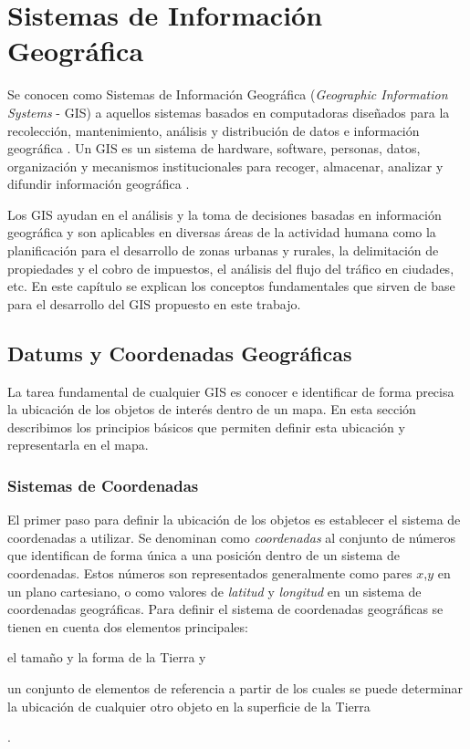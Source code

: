 \chapter{Sistemas de Información Geográfica}
\label{cap:2}

Se conocen como Sistemas de Información Geográfica (\emph{Geographic Information Systems} - GIS) a aquellos sistemas basados en computadoras diseñados para la recolección, mantenimiento, análisis y distribución de datos e información geográfica \cite{bolstad2005gis}. Un GIS es un sistema de hardware, software, personas, datos, organización y mecanismos institucionales para recoger, almacenar, analizar y difundir información geográfica \cite{longley2005geographic}.

Los GIS ayudan en el análisis y la toma de decisiones basadas en información geográfica y son aplicables en diversas áreas de la actividad humana como la planificación para el desarrollo de zonas urbanas y rurales, la delimitación de propiedades y el cobro de  impuestos, el análisis del flujo del tráfico en ciudades, etc. En este capítulo se explican los conceptos fundamentales que sirven de base para el desarrollo del GIS propuesto en este trabajo.

\section{Datums y Coordenadas Geográficas}

La tarea fundamental de cualquier GIS es conocer e identificar de forma precisa la ubicación de los objetos de interés dentro de un mapa. En esta sección describimos los principios básicos que permiten definir esta ubicación y representarla en el mapa.

\subsection{Sistemas de Coordenadas}
\label{sistema_de_coordenadas}

El primer paso para definir la ubicación de los objetos es establecer el sistema de coordenadas a utilizar. Se denominan como \emph{coordenadas} al conjunto de números que identifican de forma única a una posición dentro de un sistema de coordenadas. Estos números son representados generalmente como pares $x$,$y$ en un plano cartesiano, o como valores de \emph{latitud} y \emph{longitud} en un sistema de coordenadas geográficas. Para definir el sistema de coordenadas geográficas se tienen en cuenta dos elementos principales: \begin{enumerate*}[1)] \item el tamaño y la forma de la Tierra y \item un conjunto de elementos de referencia a partir de los cuales se puede determinar la ubicación de cualquier otro objeto en la superficie de la Tierra\end{enumerate*}.

